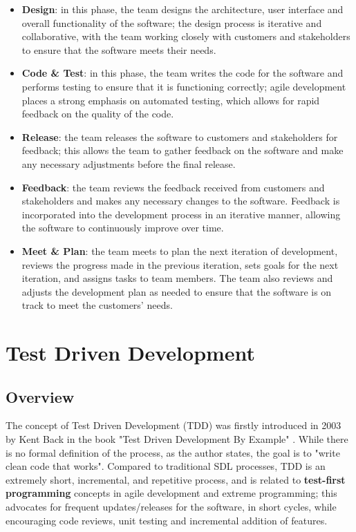 \begin{itemize}
    \item \textbf{Design}: in this phase, the team designs the architecture, user interface and overall functionality of the software; the design process is iterative and collaborative, with the team working closely with customers and stakeholders to ensure that the software meets their needs.
    \item \textbf{Code \& Test}: in this phase, the team writes the code for the software and performs testing to ensure that it is functioning correctly; agile development places a strong emphasis on automated testing, which allows for rapid feedback on the quality of the code.
    \item \textbf{Release}: the team releases the software to customers and stakeholders for feedback; this allows the team to gather feedback on the software and make any necessary adjustments before the final release.
    \item \textbf{Feedback}: the team reviews the feedback received from customers and stakeholders and makes any necessary changes to the software. Feedback is incorporated into the development process in an iterative manner, allowing the software to continuously improve over time.
    \item \textbf{Meet \& Plan}: the team meets to plan the next iteration of development, reviews the progress made in the previous iteration, sets goals for the next iteration, and assigns tasks to team members. The team also reviews and adjusts the development plan as needed to ensure that the software is on track to meet the customers' needs.
\end{itemize}


\section{Test Driven Development}

\subsection{Overview}
The concept of Test Driven Development (TDD) was firstly introduced in 2003 by Kent Back in the book "Test Driven Development By Example" \cite{TDDByExample}. While there is no formal definition of the process, as the author states, the goal is to "write clean code that works".
Compared to traditional SDL processes, TDD is an extremely short, incremental, and repetitive process, and is related to \textbf{test-first programming} concepts in agile development and extreme programming; this advocates for frequent updates/releases for the software, in short cycles, while encouraging code reviews, unit testing and incremental addition of features.


